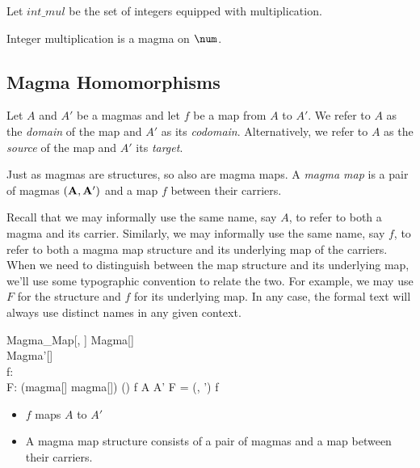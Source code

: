 \documentclass{amsart}
\begin{document}
\begin{example}

Let $int\_mul$ be the set of integers equipped with multiplication.


Integer multiplication is a magma on $\num$.


\end{example}

\subsection{Magma Homomorphisms}

Let $A$ and $A'$ be a magmas and let $f$ be a map from $A$ to $A'$.
We refer to $A$ as the \textit{domain} of the map and $A'$ as its \textit{codomain}.
Alternatively, we refer to $A$ as the \textit{source} of the map and $A'$ its \textit{target}.

Just as magmas are structures, so also are magma maps.
A \textit{magma map} is a pair of magmas $(\mathbf{A}, \mathbf{A}')$
and a map $f$ between their carriers.

Recall that we may informally use the same name, say $A$, to refer to both a magma and its carrier.
Similarly, we may informally use the same name, say $f$, to refer to both a magma map structure and its
underlying map of the carriers.
When we need to distinguish between the map structure and its underlying map,
we'll use some typographic convention to relate the two.
For example, we may use $F$ for the structure and $f$ for its underlying map.
In any case, the formal text will always use distinct names in any given context.

\begin{schema}{Magma\_Map}[\genT, \genU]
	Magma[\genT] \\
	Magma'[\genU] \\
	f: \genT \pfun \genU \\
	F: (magma[\genT] \cross magma[\genU]) \cross (\genT \pfun \genU)
\where
	f \in A \fun A'
\also
	F = (\strucA, \strucA') \mapsto f
\end{schema}

\begin{itemize}
	\item $f$ maps $A$ to $A'$
	\item A magma map structure consists of a pair of magmas and a map between their carriers.
\end{itemize}
\end{document}
